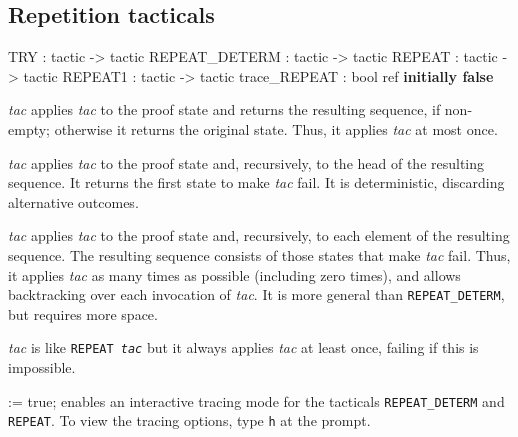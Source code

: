\subsection{Repetition tacticals}
\begin{ttbox} 
TRY           : tactic -> tactic
REPEAT_DETERM : tactic -> tactic
REPEAT        : tactic -> tactic
REPEAT1       : tactic -> tactic
trace_REPEAT  : bool ref \hfill{\bf initially false}
\end{ttbox}
\begin{ttdescription}
\item[\ttindexbold{TRY} {\it tac}] 
applies {\it tac\/} to the proof state and returns the resulting sequence,
if non-empty; otherwise it returns the original state.  Thus, it applies
{\it tac\/} at most once.

\item[\ttindexbold{REPEAT_DETERM} {\it tac}] 
applies {\it tac\/} to the proof state and, recursively, to the head of the
resulting sequence.  It returns the first state to make {\it tac\/} fail.
It is deterministic, discarding alternative outcomes.

\item[\ttindexbold{REPEAT} {\it tac}] 
applies {\it tac\/} to the proof state and, recursively, to each element of
the resulting sequence.  The resulting sequence consists of those states
that make {\it tac\/} fail.  Thus, it applies {\it tac\/} as many times as
possible (including zero times), and allows backtracking over each
invocation of {\it tac}.  It is more general than {\tt REPEAT_DETERM}, but
requires more space.

\item[\ttindexbold{REPEAT1} {\it tac}] 
is like \hbox{\tt REPEAT {\it tac}} but it always applies {\it tac\/} at
least once, failing if this is impossible.

\item[\ttindexbold{trace_REPEAT} := true;] 
enables an interactive tracing mode for the tacticals {\tt REPEAT_DETERM}
and {\tt REPEAT}.  To view the tracing options, type {\tt h} at the prompt.
\end{ttdescription}


